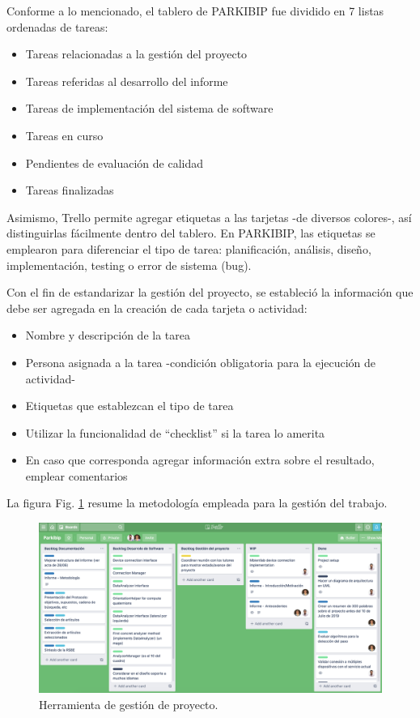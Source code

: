 Conforme a lo mencionado, el tablero de PARKIBIP fue dividido en 7 listas ordenadas de tareas:

\begin{itemize}
    \item Tareas relacionadas a la gestión del proyecto
    \item Tareas referidas al desarrollo del informe
    \item Tareas de implementación del sistema de software 
    \item Tareas en curso 
    \item Pendientes de evaluación de calidad
    \item Tareas finalizadas
\end{itemize}

Asimismo, Trello permite agregar etiquetas a las tarjetas -de diversos colores-, así distinguirlas fácilmente dentro del tablero. En PARKIBIP, las etiquetas se emplearon para diferenciar el tipo de tarea: planificación, análisis, diseño, implementación, testing o error de sistema (bug). 

Con el fin de estandarizar la gestión del proyecto, se estableció la información que debe ser agregada en la creación de cada tarjeta o actividad:

\begin{itemize}
    \item Nombre y descripción de la tarea 
    \item Persona asignada a la tarea -condición obligatoria para la ejecución de actividad-
    \item Etiquetas que establezcan el tipo de tarea 
    \item Utilizar la funcionalidad de ``checklist'' si la tarea lo amerita 
    \item En caso que corresponda agregar información extra sobre el resultado, emplear comentarios
\end{itemize}

La figura Fig. \ref{fig:admin_project} resume la metodología empleada para la gestión del trabajo. 

\begin{figure}[H]
\includegraphics[width=\textwidth]{TESIS/imagenes/chap04/trello.png}
\caption{ Herramienta de gestión de proyecto. }
\label{fig:admin_project}
\end{figure}

